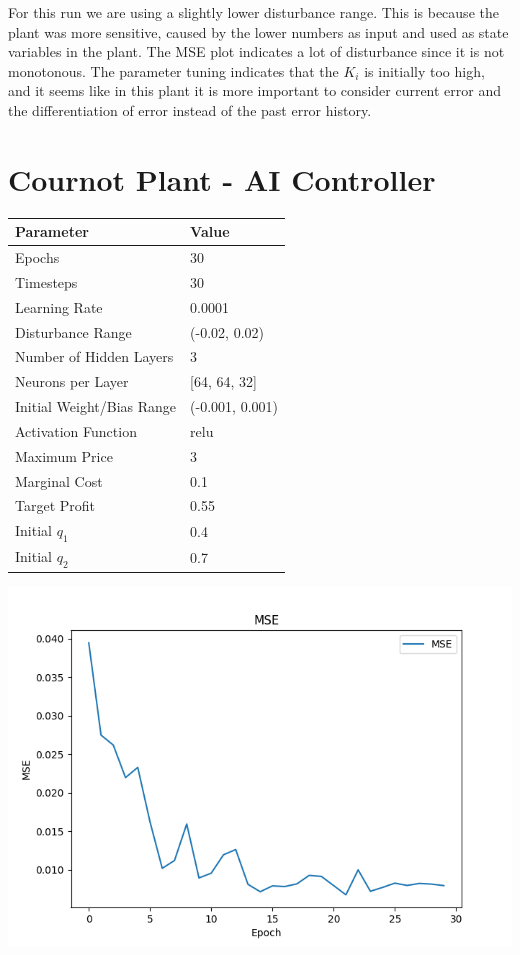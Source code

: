 \documentclass[12pt]{article}
\begin{document}
For this run we are using a slightly lower disturbance range. This is because the plant was more sensitive, caused
by the lower numbers as input and used as state variables in the plant. The MSE plot indicates a lot of disturbance since
it is not monotonous. The parameter tuning indicates that the $K_i$ is initially too high, and it seems like in this plant
it is more important to consider current error and the differentiation of error instead of the past error history.

\section*{Cournot Plant - AI Controller}

\begin{tabular}{|l|l|}
    \hline
    \textbf{Parameter}   & \textbf{Value}\\ \hline
    Epochs               & 30            \\ \hline
    Timesteps            & 30            \\ \hline
    Learning Rate        & 0.0001          \\ \hline
    Disturbance Range    & (-0.02, 0.02) \\ \hline
    Number of Hidden Layers           & 3           \\ \hline
    Neurons per Layer           & [64, 64, 32]           \\ \hline
    Initial Weight/Bias Range           & (-0.001, 0.001)           \\ \hline
    Activation Function                    & relu            \\ \hline
    Maximum Price                    & 3            \\ \hline
    Marginal Cost                    & 0.1           \\ \hline
    Target Profit & 0.55             \\ \hline
    Initial $q_1$ & 0.4             \\ \hline
    Initial $q_2$ & 0.7             \\ \hline
\end{tabular}
    
\begin{center}
    \includegraphics[width=0.8\linewidth]{figures/cournot-ai.png}
\end{center}
\end{document}
